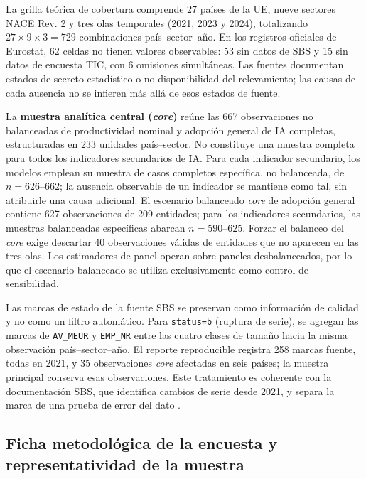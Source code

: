 \documentclass[12pt,a4paper]{article}
\begin{document}
La grilla teórica de cobertura comprende 27 países de la UE, nueve sectores NACE Rev. 2 y tres olas temporales (2021, 2023 y 2024), totalizando $27 \times 9 \times 3 = 729$ combinaciones país--sector--año. En los registros oficiales de Eurostat, 62 celdas no tienen valores observables: 53 sin datos de SBS y 15 sin datos de encuesta TIC, con 6 omisiones simultáneas. Las fuentes documentan estados de secreto estadístico o no disponibilidad del relevamiento; las causas de cada ausencia no se infieren más allá de esos estados de fuente.

La \textbf{muestra analítica central (\textit{core})} reúne las 667 observaciones no balanceadas de productividad nominal y adopción general de IA completas, estructuradas en 233 unidades país--sector. No constituye una muestra completa para todos los indicadores secundarios de IA. Para cada indicador secundario, los modelos emplean su muestra de casos completos específica, no balanceada, de $n=626\text{--}662$; la ausencia observable de un indicador se mantiene como tal, sin atribuirle una causa adicional. El escenario balanceado \textit{core} de adopción general contiene 627 observaciones de 209 entidades; para los indicadores secundarios, las muestras balanceadas específicas abarcan $n=590\text{--}625$. Forzar el balanceo del \textit{core} exige descartar 40 observaciones válidas de entidades que no aparecen en las tres olas. Los estimadores de panel operan sobre paneles desbalanceados, por lo que el escenario balanceado se utiliza exclusivamente como control de sensibilidad.

Las marcas de estado de la fuente SBS se preservan como información de calidad y no como un filtro automático. Para \texttt{status=b} (ruptura de serie), se agregan las marcas de \texttt{AV\_MEUR} y \texttt{EMP\_NR} entre las cuatro clases de tamaño hacia la misma observación país--sector--año. El reporte reproducible registra 258 marcas fuente, todas en 2021, y 35 observaciones \textit{core} afectadas en seis países; la muestra principal conserva esas observaciones. Este tratamiento es coherente con la documentación SBS, que identifica cambios de serie desde 2021, y separa la marca de una prueba de error del dato \citep{eurostat_sbs_metadata,eurostat_sbs_variables}.

\subsection{Ficha metodológica de la encuesta y representatividad de la muestra}
\end{document}
